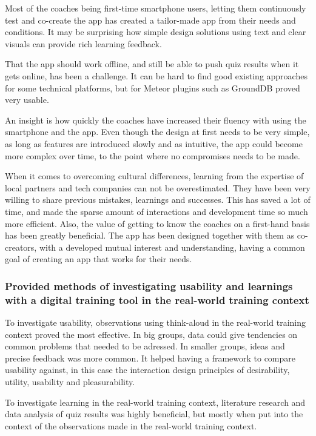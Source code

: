Most of the coaches being first-time smartphone users, letting them continuously test and co-create the app has created a tailor-made app from their needs and conditions. It may be surprising how simple design solutions using text and clear visuals can provide rich learning feedback.

That the app should work offline, and still be able to push quiz results when it gets online, has been a challenge. It can be hard to find good existing approaches for some technical platforms, but for Meteor plugins such as GroundDB proved very usable.

An insight is how quickly the coaches have increased their fluency with using the smartphone and the app. Even though the design at first needs to be very simple, as long as features are introduced slowly and as intuitive, the app could become more complex over time, to the point where no compromises needs to be made.

When it comes to overcoming cultural differences, learning from the expertise of local partners and tech companies can not be overestimated. They have been very willing to share previous mistakes, learnings and successes. This has saved a lot of time, and made the sparse amount of interactions and development time so much more efficient. Also, the value of getting to know the coaches on a first-hand basis has been greatly beneficial. The app has been designed together with them as co-creators, with a developed mutual interest and understanding, having a common goal of creating an app that works for their needs.

\subsubsection{Provided methods of investigating usability and learnings with a digital training tool in the real-world training context} %

To investigate usability, observations using think-aloud in the real-world training context proved the most effective. In big groups, data could give tendencies on common problems that needed to be adressed. In smaller groups, ideas and precise feedback was more common. It helped having a framework to compare usability against, in this case the interaction design principles of desirability, utility, usability and pleasurability.

To investigate learning in the real-world training context, literature research and data analysis of quiz results was highly beneficial, but mostly when put into the context of the observations made in the real-world training context.

